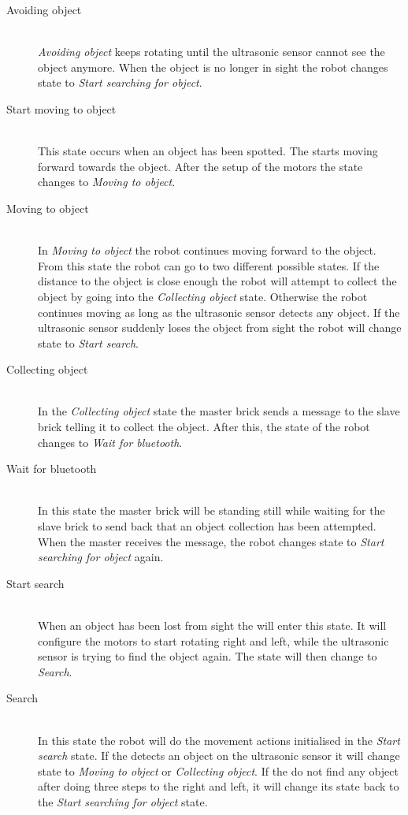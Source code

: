 \begin{description}
\item[Avoiding object] \hfill \\
\emph{Avoiding object} keeps rotating until the ultrasonic sensor cannot see the object anymore. When the object is no longer in sight the robot changes state to \emph{Start searching for object}.

\item[Start moving to object] \hfill \\
This state occurs when an object has been spotted. The \projname{} starts moving forward towards the object. After the setup of the motors the state changes to \emph{Moving to object}.

\item[Moving to object] \hfill \\
In \emph{Moving to object} the robot continues moving forward to the object. From this state the robot can go to two different possible states. If the distance to the object is close enough the robot will attempt to collect the object by going into the \emph{Collecting object} state. Otherwise the robot continues moving as long as the ultrasonic sensor detects any object. If the ultrasonic sensor suddenly loses the object from sight the robot will change state to \emph{Start search}.

\item[Collecting object] \hfill \\
In the \emph{Collecting object} state the master brick sends a message to the slave brick telling it to collect the object. After this, the state of the robot changes to \emph{Wait for bluetooth}.

\item[Wait for bluetooth] \hfill \\
In this state the master brick will be standing still while waiting for the slave brick to send back that an object collection has been attempted. When the master receives the message, the robot changes state to \emph{Start searching for object} again. 

\item[Start search] \hfill \\
When an object has been lost from sight the \projname{} will enter this state. It will configure the motors to start rotating right and left, while the ultrasonic sensor is trying to find the object again. The state will then change to \emph{Search}.

\item[Search] \hfill \\
In this state the robot will do the movement actions initialised in the \emph{Start search} state. If the \projname{} detects an object on the ultrasonic sensor it will change state to \emph{Moving to object} or \emph{Collecting object}. If the \projname{} do not find any object after doing three steps to the right and left, it will change its state back to the \emph{Start searching for object} state. 
\end{description}

